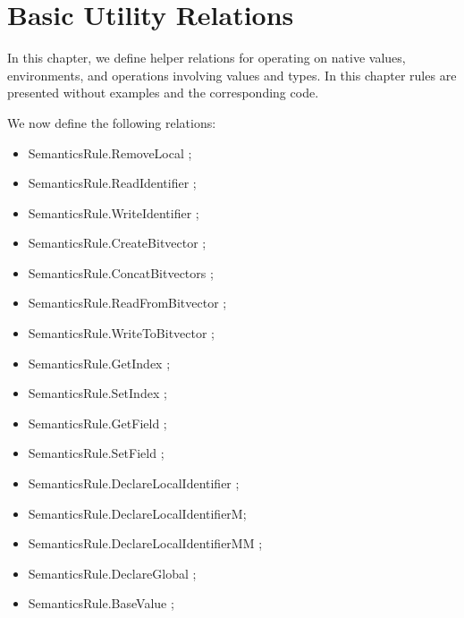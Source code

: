 \documentclass{book}
\begin{document}
\chapter{Basic Utility Relations \label{chap:utility}}

In this chapter, we define helper relations for operating on native values,
environments, and operations involving values and types.
%
In this chapter rules are presented without examples and the corresponding code.

We now define the following relations:
\begin{itemize}
  \item SemanticsRule.RemoveLocal ;
  \item SemanticsRule.ReadIdentifier ;
  \item SemanticsRule.WriteIdentifier ;
  \item SemanticsRule.CreateBitvector ;
  \item SemanticsRule.ConcatBitvectors ;
  \item SemanticsRule.ReadFromBitvector ;
  \item SemanticsRule.WriteToBitvector ;
  \item SemanticsRule.GetIndex ;
  \item SemanticsRule.SetIndex ;
  \item SemanticsRule.GetField ;
  \item SemanticsRule.SetField ;
  \item SemanticsRule.DeclareLocalIdentifier ;
  \item SemanticsRule.DeclareLocalIdentifierM;
  \item SemanticsRule.DeclareLocalIdentifierMM ;
  \item SemanticsRule.DeclareGlobal ;
  \item SemanticsRule.BaseValue ;
\end{itemize}
\end{document}
